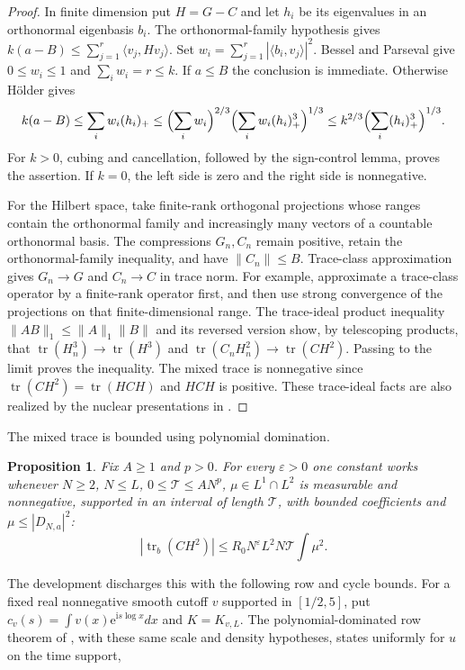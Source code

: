 \documentclass[11pt,a4paper,oneside]{article}
\newtheorem{proposition}[theorem]{Proposition}
\theoremstyle{definition}
\newcommand{\eps}{\varepsilon}
\newcommand{\ii}{\mathrm i}
\newcommand{\e}{\mathrm e}
\newcommand{\tr}{\operatorname{tr}}
\numberwithin{equation}{section}
\begin{document}
\begin{proof}
In finite dimension put $H=G-C$ and let $h_i$ be its eigenvalues in an orthonormal eigenbasis $b_i$. The orthonormal-family hypothesis gives $k(a-B)\le\sum_{j=1}^r\langle v_j,Hv_j\rangle$. Set $w_i=\sum_{j=1}^r|\langle b_i,v_j\rangle|^2$. Bessel and Parseval give $0\le w_i\le1$ and $\sum_iw_i=r\le k$. If $a\le B$ the conclusion is immediate. Otherwise H\"older gives
\[
 k(a-B)\le\sum_iw_i(h_i)_+
 \le\Bigl(\sum_iw_i\Bigr)^{2/3}
     \Bigl(\sum_iw_i(h_i)_+^3\Bigr)^{1/3}
 \le k^{2/3}\Bigl(\sum_i(h_i)_+^3\Bigr)^{1/3}.
\]
For $k>0$, cubing and cancellation, followed by the sign-control lemma, proves the assertion. If $k=0$, the left side is zero and the right side is nonnegative.

For the Hilbert space, take finite-rank orthogonal projections whose ranges contain the orthonormal family and increasingly many vectors of a countable orthonormal basis. The compressions $G_n,C_n$ remain positive, retain the orthonormal-family inequality, and have $\|C_n\|\le B$. Trace-class approximation gives $G_n\to G$ and $C_n\to C$ in trace norm. For example, approximate a trace-class operator by a finite-rank operator first, and then use strong convergence of the projections on that finite-dimensional range. The trace-ideal product inequality $\|AB\|_1\le\|A\|_1\|B\|$ and its reversed version show, by telescoping products, that $\tr(H_n^3)\to\tr(H^3)$ and $\tr(C_nH_n^2)\to\tr(CH^2)$. Passing to the limit proves the inequality. The mixed trace is nonnegative since $\tr(CH^2)=\tr(HCH)$ and $HCH$ is positive. These trace-ideal facts are also realized by the nuclear presentations in \cite{Lewko}.
\end{proof}
The mixed trace is bounded using polynomial domination.
\begin{proposition}\label{input:mixed}
Fix $A\ge1$ and $p>0$. For every $\eps>0$ one constant works whenever
$N\ge2$, $N\le L$, $0\le\mathcal T\le AN^p$, $\mu\in L^1\cap L^2$
is measurable and nonnegative, supported in an interval of length
$\mathcal T$, with bounded coefficients and $\mu\le|D_{N,a}|^2$:
\[
 |\tr_b(CH^2)|\le R_0N^\eps L^2N\mathcal T\int\mu^2.
\]
\end{proposition}
The development discharges this with the following row and cycle bounds.
For a fixed real nonnegative smooth cutoff $v$ supported in $[1/2,5]$, put
$c_v(s)=\int v(x)\e^{\ii s\log x}dx$ and $K=K_{v,L}$.
The polynomial-dominated row theorem of \cite{Lewko}, with these same scale and density hypotheses, states uniformly for $u$ on the time support,
\end{document}
